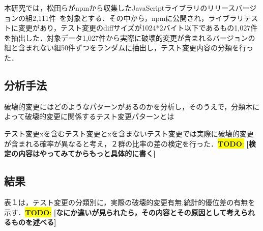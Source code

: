 \documentclass[uplatex,dvipdfmx,a4paper,twocolumn,base=11pt,jbase=11pt,ja=standard]{bxjsarticle}  %
\newcommand{\todo}[1]{\colorbox{yellow}{{\bf TODO}:}{\color{red} {\textbf{[#1]}}}}
\begin{document}
本研究では，松田らがnpmから収集したJavaScriptライブラリのリリースバージョンの組2,111件~\cite{FOSE2021_Matsuda}を対象とする．その中から，npmに公開され，ライブラリテストに変更があり，テスト変更のdiffサイズが1024*2バイト以下であるもの1,027件を抽出した．対象データ1,027件から実際に破壊的変更が含まれるバージョンの組と含まれない組50件ずつをランダムに抽出し，テスト変更内容の分類を行った．

\subsection{分析手法}

破壊的変更にはどのようなパターンがあるのかを分析し，そのうえで，分類木によって破壊的変更に関係するテスト変更パターンとは


テスト変更xを含むテスト変更とxを含まないテスト変更では実際に破壊的変更が含まれる確率が異なると考え，２群の比率の差の検定を行った．\todo{検定の内容はやってみてからもっと具体的に書く}

\subsection{結果}

表１は，テスト変更の分類別に，実際の破壊的変更有無,統計的優位差の有無を示す．\todo{なにか違いが見られたら，その内容とその原因として考えられるものを述べる}

\begin{table}[t]
    \vspace{0mm}
    \centering
    \caption{\todo{こういうイメージの表を作る}}
    \label{table_test_change}
\end{table}
\end{document}
